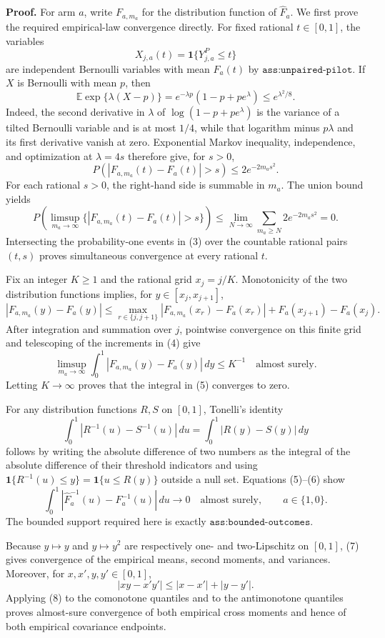 \textbf{Proof.}
For arm \(a\), write \(F_{a,m_a}\) for the distribution function of \(\widehat F_a\).  We first prove the required empirical-law convergence directly.  For fixed rational \(t\in[0,1]\), the variables
\[
 X_{j,a}(t)=\mathbf 1\{Y^P_{j,a}\le t\}
\]
are independent Bernoulli variables with mean \(F_a(t)\) by \(\texttt{ass:unpaired-pilot}\).  If \(X\) is Bernoulli with mean \(p\), then
\[
 \mathbb E\exp\{\lambda(X-p)\}
 =e^{-\lambda p}(1-p+pe^\lambda)\le e^{\lambda^2/8}.
\tag{1}
\]
Indeed, the second derivative in \(\lambda\) of \(\log(1-p+pe^\lambda)\) is the variance of a tilted Bernoulli variable and is at most \(1/4\), while that logarithm minus \(p\lambda\) and its first derivative vanish at zero.  Exponential Markov inequality, independence, and optimization at \(\lambda=4s\) therefore give, for \(s>0\),
\[
 P\!\left(\left|F_{a,m_a}(t)-F_a(t)\right|>s\right)
 \le 2e^{-2m_as^2}.
\tag{2}
\]
For each rational \(s>0\), the right-hand side is summable in \(m_a\).  The union bound yields
\[
 P\!\left(\limsup_{m_a\to\infty}
 \{|F_{a,m_a}(t)-F_a(t)|>s\}\right)
 \le \lim_{N\to\infty}\sum_{m_a\ge N}2e^{-2m_as^2}=0.
\tag{3}
\]
Intersecting the probability-one events in (3) over the countable rational pairs \((t,s)\) proves simultaneous convergence at every rational \(t\).

Fix an integer \(K\ge1\) and the rational grid \(x_j=j/K\).  Monotonicity of the two distribution functions implies, for \(y\in[x_j,x_{j+1}]\),
\[
 |F_{a,m_a}(y)-F_a(y)|
 \le
 \max_{r\in\{j,j+1\}}|F_{a,m_a}(x_r)-F_a(x_r)|
 +F_a(x_{j+1})-F_a(x_j).
\tag{4}
\]
After integration and summation over \(j\), pointwise convergence on this finite grid and telescoping of the increments in (4) give
\[
 \limsup_{m_a\to\infty}
 \int_0^1|F_{a,m_a}(y)-F_a(y)|\,dy\le K^{-1}
 \quad\text{almost surely}.
\tag{5}
\]
Letting \(K\to\infty\) proves that the integral in (5) converges to zero.

For any distribution functions \(R,S\) on \([0,1]\), Tonelli's identity
\[
 \int_0^1|R^{-1}(u)-S^{-1}(u)|\,du
 =\int_0^1|R(y)-S(y)|\,dy
\tag{6}
\]
follows by writing the absolute difference of two numbers as the integral of the absolute difference of their threshold indicators and using
\(
 \mathbf 1\{R^{-1}(u)\le y\}=\mathbf 1\{u\le R(y)\}
\)
outside a null set.  Equations (5)--(6) show
\[
 \int_0^1|\widehat F_a^{-1}(u)-F_a^{-1}(u)|\,du\longrightarrow0
 \quad\text{almost surely},\qquad a\in\{1,0\}.
\tag{7}
\]
The bounded support required here is exactly \(\texttt{ass:bounded-outcomes}\).

Because \(y\mapsto y\) and \(y\mapsto y^2\) are respectively one- and two-Lipschitz on \([0,1]\), (7) gives convergence of the empirical means, second moments, and variances.  Moreover, for \(x,x',y,y'\in[0,1]\),
\[
 |xy-x'y'|\le |x-x'|+|y-y'|.
\tag{8}
\]
Applying (8) to the comonotone quantiles and to the antimonotone quantiles proves almost-sure convergence of both empirical cross moments and hence of both empirical covariance endpoints.

